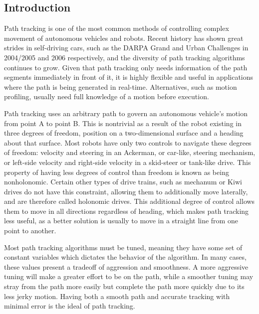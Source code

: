\documentclass[mla8alt]{mla}
\begin{document}
\newpage

\begin{paper}

\section{Introduction}

Path tracking is one of the most common methods of controlling complex movement of autonomous vehicles and robots. Recent history has shown great strides in self-driving cars, such as the DARPA Grand and Urban Challenges in 2004/2005 and 2006 respectively, and the diversity of path tracking algorithms continues to grow. Given that path tracking only needs information of the path segments immediately in front of it, it is highly flexible and useful in applications where the path is being generated in real-time. Alternatives, such as motion profiling, usually need full knowledge of a motion before execution.

Path tracking uses an arbitrary path to govern an autonomous vehicle's motion from point A to point B. This is nontrivial as a result of the robot existing in three degrees of freedom, position on a two-dimensional surface and a heading about that surface. Most robots have only two controls to navigate these degrees of freedom: velocity and steering in an Ackerman, or car-like, steering mechanism, or left-side velocity and right-side velocity in a skid-steer or tank-like drive. This property of having less degrees of control than freedom is known as being nonholonomic. Certain other types of drive trains, such as mechanum or Kiwi drives do not have this constraint, allowing them to additionally move laterally, and are therefore called holonomic drives. This additional degree of control allows them to move in all directions regardless of heading, which makes path tracking less useful, as a better solution is usually to move in a straight line from one point to another.

Most path tracking algorithms must be tuned, meaning they have some set of constant variables which dictates the behavior of the algorithm. In many cases, these values present a tradeoff of aggression and smoothness. A more aggressive tuning will make a greater effort to be on the path, while a smoother tuning may stray from the path more easily but complete the path more quickly due to its less jerky motion. Having both a smooth path and accurate tracking with minimal error is the ideal of path tracking.


\end{paper}
\end{document}
